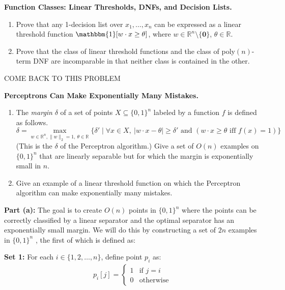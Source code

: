 \documentclass[11pt]{article}
\newcommand*{\R}{\mathbb{R}}
\DeclareMathOperator{\1}{\mathbbm{1}}
\begin{document}
\begin{problem} [15 points] \textbf{Function Classes: Linear Thresholds, DNFs, and Decision Lists.} \
	\begin{enumerate}[label=\alph*)]
		\item Prove that any 1-decision list over $x_1,\dots,x_n$ can be expressed as a linear threshold function $\1[w \cdot x \geq \theta]$, where $w \in \R^n\setminus\{\mathbf{0}\}$, $\theta \in \R$.
		\item Prove that the class of linear threshold functions and the class of
		poly$(n)$-term DNF are incomparable in that neither class is contained in the
		other.
	\end{enumerate}

COME BACK TO THIS PROBLEM
\end{problem}
\begin{problem}[15 points] \textbf{Perceptrons Can Make Exponentially Many Mistakes.}\
	\begin{enumerate}[label = \alph*)]
		\item The {\em margin} $\delta$ of a set of points $X \subseteq \{0,1\}^n$
		labeled by a function $f$ is defined as follows.  $$\delta = \max_{w \in
			\R^n, \|w\|_2 = 1,\ \theta \in \R} \{ \delta' \mid \forall x \in
		X,\ |w\cdot x - \theta| \geq \delta'  \text{ and }  (w \cdot x \geq \theta
		\text{ iff } f(x) = 1)  \}$$ (This is the $\delta$ of the
		Perceptron algorithm.) Give a set of $O(n)$ examples on $\{0,1\}^n$ that are
		linearly separable but for which the margin is exponentially small in $n$.
		\item Give an example of a linear threshold function on which the Perceptron algorithm can make exponentially many mistakes.
	\end{enumerate}

\textbf{Part (a):} The goal is to create $O(n)$ points in $\{0,1\}^n$ where the points can be correctly classified by a linear separator and the optimal separator has an exponentially small margin. We will do this by constructing a set of $2n$ examples in $\{0,1\}^n$ , the first of which is defined as:

\textbf{Set 1:} For each $i \in \{1, 2, \ldots, n\}$, define point $p_i$ as:
\begin{align}
p_i[j] = 
\begin{cases}
1 & \text{if } j = i \\
0 & \text{otherwise}
\end{cases}
\end{align}


\end{problem}
\end{document}
